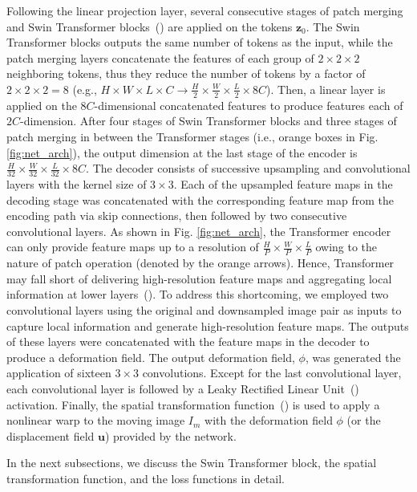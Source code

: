 \documentclass[times,twocolumn,final]{elsarticle}
\begin{document}
Following the linear projection layer, several consecutive stages of patch merging and Swin Transformer blocks~(\cite{liu2021swin}) are applied on the tokens $\mathbf{z}_0$. The Swin Transformer blocks outputs the same number of tokens as the input, while the patch merging layers concatenate the features of each group of $2\times2\times2$ neighboring tokens, thus they reduce the number of tokens by a factor of $2\times2\times2=8$ (e.g., $H\times W\times L\times C\xrightarrow{}\frac{H}{2}\times\frac{W}{2}\times\frac{L}{2}\times 8C$). Then, a linear layer is applied on the $8C$-dimensional concatenated features to produce features each of $2C$-dimension. After four stages of Swin Transformer blocks and three stages of patch merging in between the Transformer stages (i.e., orange boxes in Fig. \ref{fig:net_arch}), the output dimension at the last stage of the encoder is $\frac{H}{32}\times\frac{W}{32}\times\frac{L}{32}\times 8C$. The decoder consists of successive upsampling and convolutional layers with the kernel size of $3\times3$. Each of the upsampled feature maps in the decoding stage was concatenated with the corresponding feature map from the encoding path via skip connections, then followed by two consecutive convolutional layers. As shown in Fig. \ref{fig:net_arch}, the Transformer encoder can only provide feature maps up to a resolution of $\frac{H}{P}\times\frac{W}{P}\times\frac{L}{P}$ owing to the nature of patch operation (denoted by the orange arrows). Hence, Transformer may fall short of delivering high-resolution feature maps and aggregating local information at lower layers~(\cite{raghu2021vision}). To address this shortcoming, we employed two convolutional layers using the original and downsampled image pair as inputs to capture local information and generate high-resolution feature maps. The outputs of these layers were concatenated with the feature maps in the decoder to produce a deformation field. The output deformation field, $\phi$, was generated the application of sixteen $3\times3$ convolutions. Except for the last convolutional layer, each convolutional layer is followed by a Leaky Rectified Linear Unit~(\cite{maas2013rectifier}) activation. Finally, the spatial transformation function~(\cite{jaderberg2015spatial}) is used to apply a nonlinear warp to the moving image $I_m$ with the deformation field $\phi$ (or the displacement field $\mathbf{u}$) provided by the network.

In the next subsections, we discuss the Swin Transformer block, the spatial transformation function, and the loss functions in detail.
\end{document}
